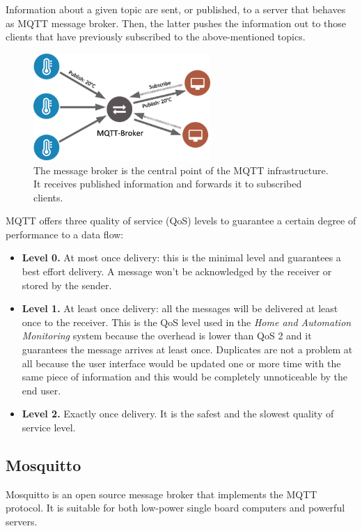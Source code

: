 Information about a given topic are sent, or published, to a server that behaves as MQTT message broker. Then, the latter pushes the information out to those clients that have previously subscribed to the above-mentioned topics.

\begin{figure}[H]
	\begin{center}
		\includegraphics[width=0.6\textwidth]{./pictures/mqtt.png}
		\caption{The message broker is the central point of the MQTT infrastructure. It receives published information and forwards it to subscribed clients.}
		\label{mqtt_functioning}
	\end{center}
\end{figure}

\noindent
MQTT offers three quality of service (QoS) levels to guarantee a certain degree of performance to a data flow:

\begin{itemize}
	\item \textbf{Level 0.} At most once delivery: this is the minimal level and guarantees a best effort delivery. A message won't be acknowledged by the receiver or stored by the sender.
	\item \textbf{Level 1.} At least once delivery: all the messages will be delivered at least once to the receiver. This is the QoS level used in the \textit{Home and Automation Monitoring} system because the overhead is lower than QoS 2 and it guarantees the message arrives at least once. Duplicates are not a problem at all because the user interface would be updated one or more time with the same piece of information and this would be completely unnoticeable by the end user.
	\item \textbf{Level 2.} Exactly once delivery. It is the safest and the slowest quality of service level.
\end{itemize}

\subsection{Mosquitto}
Mosquitto is an open source message broker that implements the MQTT protocol. It is suitable for both low-power single board computers and powerful servers.

